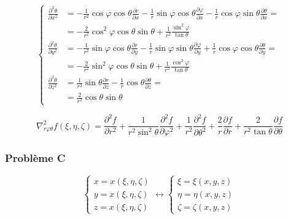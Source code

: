 \documentclass
[
a4paper,                      %
twoside,					  %
12pt,                         %
abstract,		      %
fleqn,                        %
]
{scrartcl} %
\begin{document}
\begin{description}
\begin{equation}
\begin{cases}
\frac{\partial^{2} \theta}{\partial x^{2}}&=-\frac{1}{r^{2}}\cos{\varphi}\cos{\theta}\frac{\partial r}{\partial x}-\frac{1}{r}\sin{\varphi}\cos{\theta}\frac{\partial \varphi}{\partial x}-\frac{1}{r}\cos{\varphi}\sin{\theta}\frac{\partial \theta}{\partial x}=\\
&=-\frac{2}{r^{2}}\cos^{2}{\varphi}\cos{\theta}\sin{\theta}+\frac{1}{r^{2}}\frac{\sin^{2}{\varphi}}{\tan{\theta}}\\
\frac{\partial^{2} \theta}{\partial y^{2}}&=-\frac{1}{r^{2}}\sin{\varphi}\cos{\theta}\frac{\partial r}{\partial y}-\frac{1}{r}\sin{\varphi}\sin{\theta}\frac{\partial \varphi}{\partial y}+\frac{1}{r}\cos{\varphi}\cos{\theta}\frac{\partial \theta}{\partial y}=\\
&=-\frac{2}{r^{2}}\sin^{2}{\varphi}\cos{\theta}\sin{\theta}+\frac{1}{r^{2}}\frac{\cos^{2}{\varphi}}{\tan{\theta}}\\
\frac{\partial^{2}\theta}{\partial z^{2}}&=\frac{1}{r^{2}}\sin{\theta}\frac{\partial r}{\partial z}-\frac{1}{r}\cos{\theta}\frac{\partial\theta}{\partial z}=\\
&=\frac{2}{r^{2}}\cos{\theta}\sin{\theta}
\end{cases}
\end{equation}

\begin{equation}
\nabla_{r\varphi\theta}^{2}f\left(\xi,\eta,\zeta\right)=\frac{\partial^{2} f}{\partial r^{2}}+\frac{1}{r^{2}\sin^{2}{\theta}}\frac{\partial^{2} f}{\partial\varphi^{2}}+\frac{1}{r^{2}}\frac{\partial^{2} f}{\partial\theta^{2}}+\frac{2}{r}\frac{\partial f}{\partial r}+\frac{2}{r^{2}\tan{\theta}}\frac{\partial f}{\partial\theta}
\end{equation}

\end{description}

\newpage

\subsubsection{Probl\`eme C}

\begin{equation}
\begin{cases}
x=x\left(\xi,\eta,\zeta\right)\\
y=x\left(\xi,\eta,\zeta\right)\\
z=x\left(\xi,\eta,\zeta\right)
\end{cases}\longleftrightarrow\begin{cases}
\xi=\xi\left(x,y,z\right)\\
\eta=\eta\left(x,y,z\right)\\
\zeta=\zeta\left(x,y,z\right)
\end{cases}
\end{equation}
\end{document}

